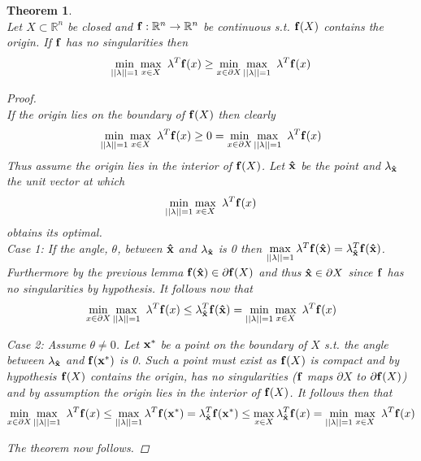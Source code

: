 \documentclass[11pt]{article}
\theoremstyle{plain}
\newtheorem{thm}{Theorem}[section]
\theoremstyle{definition}
\theoremstyle{remark}
\begin{document}
\begin{thm} \ \\
\label{MainInEq}
Let $X\subset\mathbb{R}^n$ be closed and $\bold{f}:\mathbb{R}^n\rightarrow\mathbb{R}^n$ be continuous s.t. $\bold{f}(X)$ contains the origin. If $\bold{f}$ has no singularities then $$\min\limits_{||\bold{\lambda}||=1}\max\limits_{x\in X}\ \bold{\lambda}^T\bold{f}(x)\geq \min\limits_{x\in \partial X}\max\limits_{||\bold{\lambda}||=1}\ \bold{\lambda}^T\bold{f}(x)$$
\begin{proof} \ \\
If the origin lies on the boundary of $\bold{f}(X)$ then clearly $$\min\limits_{||\bold{\lambda}||=1}\max\limits_{x\in X}\ \bold{\lambda}^T\bold{f}(x)\geq 0 = \min\limits_{x\in \partial X}\max\limits_{||\bold{\lambda}||=1}\ \bold{\lambda}^T\bold{f}(x)$$
Thus assume the origin lies in the interior of $\bold{f}(X)$.
Let $\bold{\hat{x}}$ be the point and $\bold{\lambda}_{\bold{\hat{x}}}$ the unit vector at which $$\min\limits_{||\bold{\lambda}||=1}\max\limits_{x\in X}\ \bold{\lambda}^T\bold{f}(x)$$
obtains its optimal. \\

Case 1: If the angle, $\theta$, between $\bold{\hat{x}}$ and $\bold{\lambda}_{\bold{\hat{x}}}$ is 0 then $\max\limits_{||\bold{\lambda}||=1}\bold{\lambda}^T\bold{f}(\bold{\hat{x}})=\bold{\lambda}_{\bold{\hat{x}}}^T\bold{f}(\bold{\hat{x}})$. Furthermore by the previous lemma $\bold{f}(\bold{\hat{x}})\in \partial \bold{f}(X)$ and thus $\bold{\hat{x}}\in \partial X$ since $\bold{f}$ has no singularities by hypothesis. It follows now that $$\min\limits_{x\in \partial X}\max\limits_{||\bold{\lambda}||=1}\ \bold{\lambda}^T\bold{f}(x)\leq \bold{\lambda}_{\bold{\hat{x}}}^T\bold{f}(\bold{\hat{x}})=\min\limits_{||\bold{\lambda}||=1}\max\limits_{x\in X}\ \bold{\lambda}^T\bold{f}(x)$$

Case 2: Assume $\theta \neq 0$. Let $\bold{x^*}$ be a point on the boundary of $X$ s.t. the angle between $\bold{\lambda}_{\bold{\hat{x}}}$ and $\bold{f}(\bold{x^*})$ is 0. Such a point must exist as $\bold{f}(X)$ is compact and by hypothesis $\bold{f}(X)$ contains the origin, has no singularities ($\bold{f}$ maps $\partial X$ to $\partial \bold{f}(X)$) and by assumption the origin lies in the interior of $\bold{f}(X)$. It follows then that $$\min\limits_{x\in \partial X}\max\limits_{||\bold{\lambda}||=1}\ \bold{\lambda}^T\bold{f}(x)\leq \max\limits_{||\bold{\lambda}||=1}\bold{\lambda}^T \bold{f}(\bold{x^*}) =\bold{\lambda}_{\bold{\hat{x}}}^T\bold{f}(\bold{x^*})\leq \max\limits_{x\in X}\bold{\lambda}_{\bold{\hat{x}}}^T\bold{f}(x)=\min\limits_{||\bold{\lambda}||=1}\max\limits_{x\in X}\ \bold{\lambda}^T\bold{f}(x)$$

The theorem now follows.

\end{proof}
\end{thm}
\end{document}
